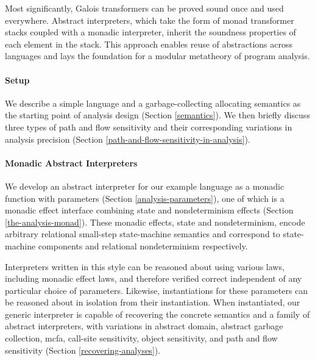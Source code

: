 \par

Most significantly, Galois transformers can be proved sound once and
used everywhere. Abstract interpreters, which take the form of monad
transformer stacks coupled with a monadic interpreter, inherit the
soundness properties of each element in the stack. This approach enables
reuse of abstractions across languages and lays the foundation for a
modular metatheory of program analysis.

\par

\paragraph{Setup}

We describe a simple language and a garbage-collecting allocating
semantics as the starting point of analysis design (Section
\ref{semantics}). We then briefly discuss three types of path and flow
sensitivity and their corresponding variations in analysis precision
(Section \ref{path-and-flow-sensitivity-in-analysis}).

\par

\paragraph{Monadic Abstract Interpreters}

We develop an abstract interpreter for our example language as a monadic
function with parameters (Section \ref{analysis-parameters}), one of
which is a monadic effect interface combining state and nondeterminism
effects (Section \ref{the-analysis-monad}). These monadic effects, state
and nondeterminism, encode arbitrary relational small-step state-machine
semantics and correspond to state-machine components and relational
nondeterminism respectively.

\par

Interpreters written in this style can be reasoned about using various
laws, including monadic effect laws, and therefore verified correct
independent of any particular choice of parameters. Likewise,
instantiations for these parameters can be reasoned about in isolation
from their instantiation. When instantiated, our generic interpreter is
capable of recovering the concrete semantics and a family of abstract
interpreters, with variations in abstract domain, abstract garbage
collection, mcfa, call-site sensitivity, object sensitivity, and path
and flow sensitivity (Section \ref{recovering-analyses}).

